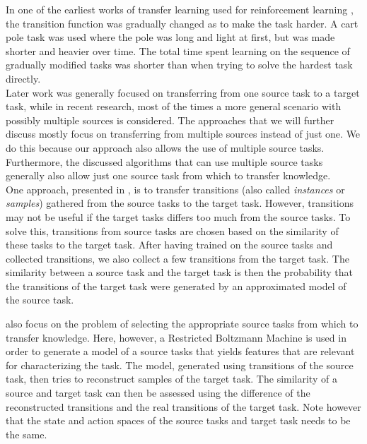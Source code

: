 In one of the earliest works of transfer learning used for reinforcement learning \parencite{conf/ijcai/SelfridgeSB85}, the transition function was gradually changed as to make the task harder.
A cart pole task was used where the pole was long and light at first, but was made shorter and heavier over time.
The total time spent learning on the sequence of gradually modified tasks was shorter than when trying to solve the hardest task directly.\\

Later work was generally focused on transferring from one source task to a target task, while in recent research, most of the times a more general scenario with possibly multiple sources is considered.
The approaches that we will further discuss mostly focus on transferring from multiple sources instead of just one.
We do this because our approach also allows the use of multiple source tasks.
Furthermore, the  discussed algorithms that can use multiple source tasks generally also allow just one source task from which to transfer knowledge.\\

One approach, presented in \cite{lazaric2008transfer}, is to transfer transitions (also called \textit{instances} or \textit{samples}) gathered from the source tasks to the target task.
However, transitions may not be useful if the target tasks differs too much from the source tasks.
To solve this, transitions from source tasks are chosen based on the similarity of these tasks to the target task.
After having trained on the source tasks and collected transitions, we also collect a few transitions from the target task.
The similarity between a source task and the target task is then the probability that the transitions of the target task were generated by an approximated model of the source task.

\cite{Ammar2014} also focus on the problem of selecting the appropriate source tasks from which to transfer knowledge.
Here, however, a Restricted Boltzmann Machine \parencite{Smolensky1986} is used in order to generate a model of a source tasks that yields features that are relevant for characterizing the task.
The model, generated using transitions of the source task, then tries to reconstruct samples of the target task.
The similarity of a source and target task can then be assessed using the difference of the reconstructed transitions and the real transitions of the target task.
Note however that the state and action spaces of the source tasks and target task needs to be the same.\\

